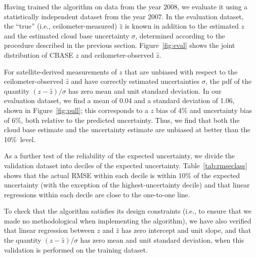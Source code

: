 \documentclass[essd,manuscript]{copernicus}
\begin{document}
Having trained the algorithm on data from the year 2008, we evaluate it using a
statistically independent dataset from the year 2007.  In the evaluation
dataset, the ``true'' (i.e., ceilometer-measured) $\hat{z}$ is known in
addition to the estimated \ensuremath{z}{} and the estimated cloud base uncertainty $\sigma$,
determined according to the procedure described in the previous section.
Figure~\ref{fig:eval} shows the joint distribution of CBASE \ensuremath{z}{} and
ceilometer-observed $\hat{z}$.  

For satellite-derived measurements of \ensuremath{z}{} that are unbiased with respect
to the ceilometer-observed $\hat{\ensuremath{z}}$ and have correctly estimated
uncertainties $\sigma$, the pdf of the quantity $(\ensuremath{z} - \hat{z})/\sigma$ has zero
mean and unit standard deviation. In our evaluation dataset, we find a mean of
0.04 and a standard
deviation of 1.06, shown in
Figure~\ref{fig:pull}; this corresponds to a \ensuremath{z}{} bias of %
4\% and
uncertainty bias of %
6\%,
both relative to the predicted uncertainty.  Thus, we find that both the cloud
base estimate and the uncertainty estimate are unbiased at better than the 10\%\
level.

As a further test of the reliability of the expected uncertainty, we divide the
validation dataset into deciles of the expected uncertainty.
Table~\ref{tab:rmseclass} shows that the actual RMSE within each decile is
within 10\% of the expected uncertainty (with the exception of the highest-uncertainty
decile) and that linear regressions within each
decile are close to the one-to-one line.

To check that the algorithm satisfies its design constraints (i.e., to ensure
that we made no methodological when implementing the algorithm), we have also
verified that linear regression between $z$ and $\hat{z}$ has zero intercept and
unit slope, and that the quantity $(z - \hat{z})/\sigma$ has zero mean and unit
standard deviation, when this validation is performed on the training dataset.
\end{document}
